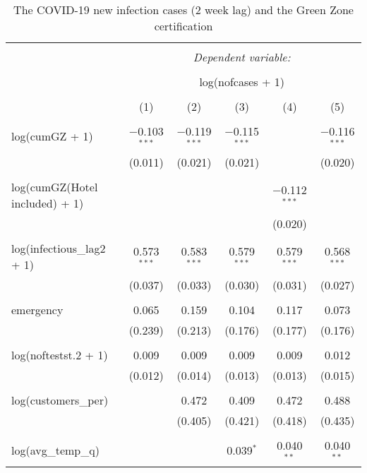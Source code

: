 
\begin{table}[!htbp] \centering 
  \caption{The COVID-19 new infection cases (2 week lag) and the Green Zone certification} 
  \label{} 
\begin{tabular}{@{\extracolsep{5pt}}lccccc} 
\\[-1.8ex]\hline 
\hline \\[-1.8ex] 
 & \multicolumn{5}{c}{\textit{Dependent variable:}} \\ 
\cline{2-6} 
\\[-1.8ex] & \multicolumn{5}{c}{log(nofcases + 1)} \\ 
\\[-1.8ex] & (1) & (2) & (3) & (4) & (5)\\ 
\hline \\[-1.8ex] 
 log(cumGZ + 1) & $-$0.103$^{***}$ & $-$0.119$^{***}$ & $-$0.115$^{***}$ &  & $-$0.116$^{***}$ \\ 
  & (0.011) & (0.021) & (0.021) &  & (0.020) \\ 
  & & & & & \\ 
 log(cumGZ(Hotel included) + 1) &  &  &  & $-$0.112$^{***}$ &  \\ 
  &  &  &  & (0.020) &  \\ 
  & & & & & \\ 
 log(infectious\_lag2 + 1) & 0.573$^{***}$ & 0.583$^{***}$ & 0.579$^{***}$ & 0.579$^{***}$ & 0.568$^{***}$ \\ 
  & (0.037) & (0.033) & (0.030) & (0.031) & (0.027) \\ 
  & & & & & \\ 
 emergency & 0.065 & 0.159 & 0.104 & 0.117 & 0.073 \\ 
  & (0.239) & (0.213) & (0.176) & (0.177) & (0.176) \\ 
  & & & & & \\ 
 log(noftestst.2 + 1) & 0.009 & 0.009 & 0.009 & 0.009 & 0.012 \\ 
  & (0.012) & (0.014) & (0.013) & (0.013) & (0.015) \\ 
  & & & & & \\ 
 log(customers\_per) &  & 0.472 & 0.409 & 0.472 & 0.488 \\ 
  &  & (0.405) & (0.421) & (0.418) & (0.435) \\ 
  & & & & & \\ 
 log(avg\_temp\_q) &  &  & 0.039$^{*}$ & 0.040$^{**}$ & 0.040$^{**}$ \\ 

\end{tabular}
\end{table}
